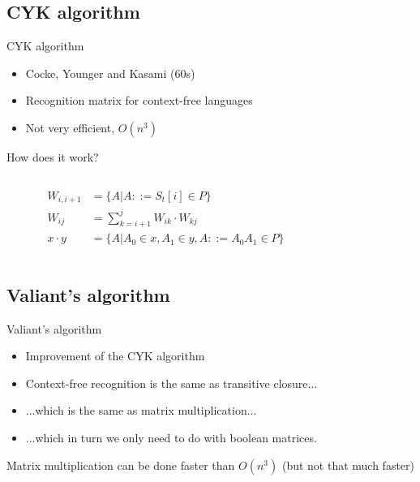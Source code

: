 \documentclass{beamer}
\newcommand{\subt}[3] { 
  \draw[grid] (#1,#1) -- (#1,#2) node[inChart] {#3} -- (#2,#2);
  \fill[color=black] (#1,#2) circle (2pt)
 }
\newcommand{\mrk}[2]{\node[inChart] at (#1,#1) {#2}}
\begin{document}
\subsection{CYK algorithm}
\begin{frame}{CYK algorithm}
    \begin{itemize}
        \item Cocke, Younger and Kasami (60s)
        \item Recognition matrix for context-free languages
        \item Not very efficient, $O(n^3)$
    \end{itemize}
\end{frame}

\begin{frame}{How does it work?}
  \begin{columns}[c]
  \begin{column}{.5\textwidth}

    \begin{align*}
    W_{i,i+1} &= \{ A | A ::= S_t[i] \in P \} \\
    W_{ij}    &= \sum_{k=i+1}^{j} W_{ik} \cdot W_{kj} \\
    x \cdot y &= \{ A | A_0 \in x, A_1 \in y, A ::= A_0A_1 \in P \} \label{abc}
    \end{align*}

  \end{column}

  \begin{column}{.4\textwidth}
  \end{column}
  \end{columns}
\end{frame}

\subsection{Valiant's algorithm}
\begin{frame}{Valiant's algorithm}
    \begin{itemize}
        \item Improvement of the CYK algorithm
        \item Context-free recognition is the same as transitive closure...
        \item ...which is the same as matrix multiplication...
        \item ...which in turn we only need to do with boolean matrices.
    \end{itemize}
    Matrix multiplication can be done faster than $O(n^3)$ (but not that much
    faster)
\end{frame}
\end{document}
